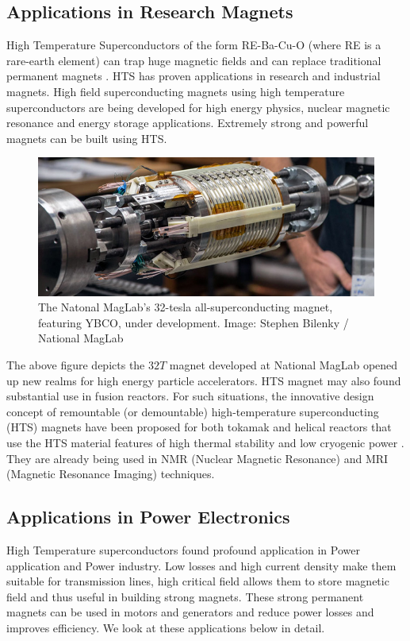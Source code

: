 \documentclass{article}
\begin{document}
	\subsection{Applications in Research Magnets}
	High Temperature Superconductors of the form RE-Ba-Cu-O (where RE is a rare-earth element) can trap huge magnetic fields and can replace traditional permanent magnets \cite{htspm}. HTS has proven applications in research and industrial magnets. High field superconducting magnets using high temperature superconductors are being developed for high energy physics, nuclear magnetic resonance and energy storage applications. Extremely strong and powerful magnets can be built using HTS.
	
	\begin{figure}[h]
		\centering
		\includegraphics[width=15cm]{32_tesla_coil_730.jpg}
		\caption{The Natonal MagLab's 32-tesla all-superconducting magnet, featuring YBCO, under development. Image: Stephen Bilenky / National MagLab}
		
	\end{figure} 
	
	The above figure depicts the $32 T$ magnet developed at National MagLab opened up new realms for high energy particle accelerators. HTS magnet may also found substantial use in  fusion reactors. For such situations, the innovative design concept of remountable (or demountable) high-temperature superconducting (HTS) magnets have been proposed for both tokamak and helical reactors that use the HTS material features of high thermal stability and low cryogenic power \cite{TamuraHTSFusion}. They are already being used in NMR (Nuclear Magnetic Resonance) and MRI (Magnetic Resonance Imaging) techniques.
	
	\subsection{Applications in Power Electronics}
	
	High Temperature superconductors found profound application in Power application and Power industry. Low losses and high current density make them suitable for transmission lines, high critical field allows them to store magnetic field and thus useful in building strong magnets. These strong permanent magnets can be used in motors and generators and reduce power losses and improves efficiency. We look at these applications below in detail.
\end{document}
